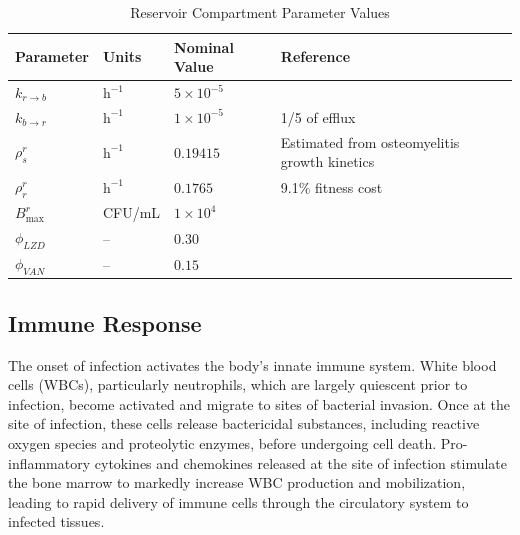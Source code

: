 \documentclass[12pt, draftcls, onecolumn]{IEEEtran}
\begin{document}
\begin{table}[H]
    \centering
    \large %
    \renewcommand{\arraystretch}{1.35} %
    \caption{Reservoir Compartment Parameter Values}
    \vspace{0.5cm}
    \begin{tabular}{l l l l}
    \hline
    \textbf{Parameter} & \textbf{Units} & \textbf{Nominal Value} & \textbf{Reference} \\
    \hline
    $k_{r \to b}$          & $\text{h}^{-1}$     & $5 \times 10^{-5}$ & \cite{Kostakioti2013} \\
    $k_{b \to r}$          & $\text{h}^{-1}$     & $1 \times 10^{-5}$  & 1/5 of efflux \\
    $\rho_{s}^{r}$         & $\text{h}^{-1}$     & $0.19415$              & Estimated from osteomyelitis growth kinetics \\
    $\rho_{r}^{r}$         & $\text{h}^{-1}$     & $0.1765$            &  9.1\% fitness cost\\
    $B_{\max}^{r}$         & CFU/mL              & $1 \times 10^{4}$   & \cite{liu2025development} \\
    $\phi_{LZD}$           & --                  & $0.30$              & \cite{dryden2011linezolid} \cite{spellberg2012systemic} \\
    $\phi_{VAN}$           & --                  & $0.15$              & \cite{MomoduSavaliya2023} \cite{spellberg2012systemic} \\
    \hline
    \end{tabular}
\end{table}

 

\subsection{Immune Response}
The onset of infection activates the body’s innate immune system. White blood cells (WBCs), particularly neutrophils, which are largely quiescent prior to infection, become activated and migrate to sites of bacterial invasion. Once at the site of infection, these cells release bactericidal substances, including reactive oxygen species and proteolytic enzymes, before undergoing cell death. Pro-inflammatory cytokines and chemokines released at the site of infection stimulate the bone marrow to markedly increase WBC production and mobilization, leading to rapid delivery of immune cells through the circulatory system to infected tissues.
\end{document}
